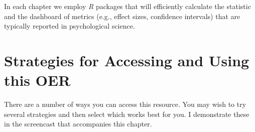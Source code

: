 \documentclass[
  11pt,
]{book}
\begin{document}
In each chapter we employ \emph{R} packages that will efficiently calculate the statistic and the dashboard of metrics (e.g., effect sizes, confidence intervals) that are typically reported in psychological science.

\hypertarget{strategies-for-accessing-and-using-this-oer}{%
\section{Strategies for Accessing and Using this OER}\label{strategies-for-accessing-and-using-this-oer}}

There are a number of ways you can access this resource. You may wish to try several strategies and then select which works best for you. I demonstrate these in the screencast that accompanies this chapter.
\end{document}
